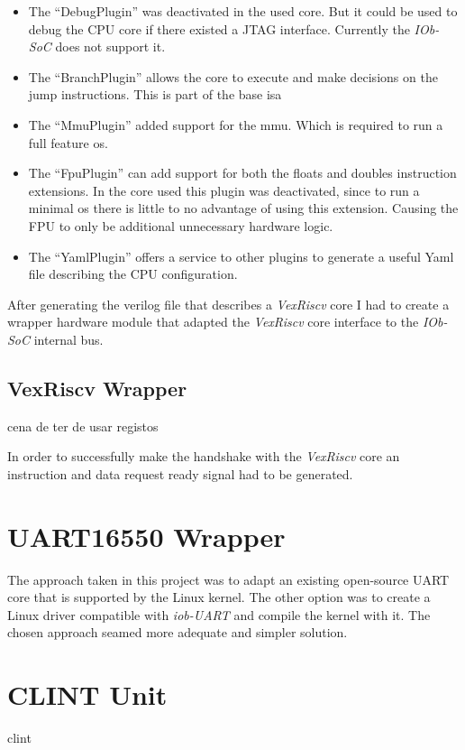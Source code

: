 \begin{itemize}
  \item The \enquote{DebugPlugin} was deactivated in the used core. But it could be used to debug the CPU core if there existed a JTAG interface. Currently the \textit{IOb-SoC} does not support it.
  \item The \enquote{BranchPlugin} allows the core to execute and make decisions on the jump instructions. This is part of the base \acrfull{isa}
  \item The \enquote{MmuPlugin} added support for the \acrfull{mmu}. Which is required to run a full feature \acrshort{os}.
  \item The \enquote{FpuPlugin} can add support for both the floats and doubles instruction extensions. In the core used this plugin was deactivated, since to run a minimal \acrshort{os} there is little to no advantage of using this extension. Causing the FPU to only be additional unnecessary hardware logic.
  \item The \enquote{YamlPlugin} offers a service to other plugins to generate a useful Yaml file describing the CPU configuration. %
\end{itemize}

After generating the verilog file that describes a \textit{VexRiscv} core I had to create a wrapper hardware module that adapted the \textit{VexRiscv} core interface to the \textit{IOb-SoC} internal bus.

\subsection{VexRiscv Wrapper}
cena de ter de usar registos 

In order to successfully make the handshake with the \textit{VexRiscv} core an instruction and data request ready signal had to be generated.

\section{UART16550 Wrapper}
The approach taken in this project was to adapt an existing open-source UART core that is supported by the Linux kernel. The other option was to create a Linux driver compatible with \textit{iob-UART} and compile the kernel with it. The chosen approach seamed more adequate and simpler solution.

\section{CLINT Unit}
\acrshort{clint}

